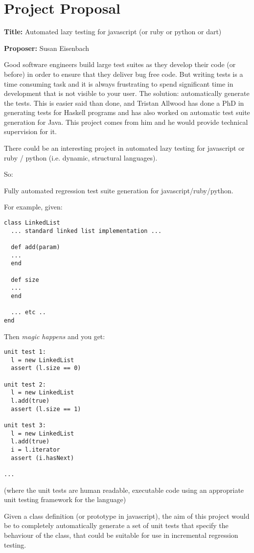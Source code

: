 \appendix
\chapter{Project Proposal}
\textbf{Title:} Automated lazy testing for javascript (or ruby or python or
dart)

\textbf{Proposer:} Susan Eisenbach

Good software engineers build large test suites as they develop their code (or before) in order to ensure that they deliver bug free code. But writing tests is a time consuming task and it is always frustrating to spend significant time in development that is not visible to your user. The solution: automatically generate the tests. This is easier said than done, and Tristan Allwood has done a PhD in generating tests for Haskell programs and has also worked on automatic test suite generation for Java. This project comes from him and he would provide technical supervision for it.

There could be an interesting project in automated lazy testing for
javascript or ruby / python (i.e. dynamic, structural languages).



So:

Fully automated regression test suite generation for
javascript/ruby/python.

For example, given:
\begin{verbatim}
class LinkedList
  ... standard linked list implementation ...

  def add(param)
  ...
  end

  def size
  ...
  end

  ... etc ..
end
\end{verbatim}

Then \emph{magic happens} and you get:

\begin{verbatim}
unit test 1:
  l = new LinkedList
  assert (l.size == 0)

unit test 2:
  l = new LinkedList
  l.add(true)
  assert (l.size == 1)

unit test 3:
  l = new LinkedList
  l.add(true)
  i = l.iterator
  assert (i.hasNext)

...
\end{verbatim}

(where the unit tests are human readable, executable code using an
appropriate unit testing framework for the language)

Given a class definition (or prototype in javascript), the aim of this
project would be to completely automatically generate a set of unit
tests that specify the behaviour of the class, that could be suitable
for use in incremental regression testing.

